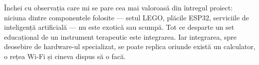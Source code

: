 Închei cu observația care mi se pare cea mai valoroasă din întregul proiect: niciuna dintre componentele folosite — setul LEGO, plăcile ESP32, serviciile de inteligență artificială — nu este exotică sau scumpă. Tot ce desparte un set educațional de un instrument terapeutic este integrarea. Iar integrarea, spre deosebire de hard\-ware-ul specializat, se poate replica oriunde există un calculator, o rețea Wi-Fi și cineva dispus să o facă.
